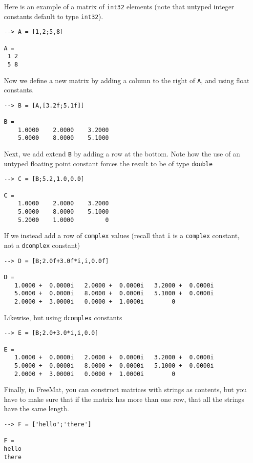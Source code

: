 Here is an example of a matrix of \verb|int32| elements (note that
untyped integer constants default to type \verb|int32|).
\begin{verbatim}
--> A = [1,2;5,8]

A = 
 1 2 
 5 8 
\end{verbatim}
Now we define a new matrix by adding a column to the right of
\verb|A|, and using float constants.
\begin{verbatim}
--> B = [A,[3.2f;5.1f]]

B = 
    1.0000    2.0000    3.2000 
    5.0000    8.0000    5.1000 
\end{verbatim}
Next, we add extend \verb|B| by adding a row at the bottom.  Note
how the use of an untyped floating point constant forces the
result to be of type \verb|double|
\begin{verbatim}
--> C = [B;5.2,1.0,0.0]

C = 
    1.0000    2.0000    3.2000 
    5.0000    8.0000    5.1000 
    5.2000    1.0000         0 
\end{verbatim}
If we instead add a row of \verb|complex| values (recall that \verb|i| is
a \verb|complex| constant, not a \verb|dcomplex| constant)
\begin{verbatim}
--> D = [B;2.0f+3.0f*i,i,0.0f]

D = 
   1.0000 +  0.0000i   2.0000 +  0.0000i   3.2000 +  0.0000i 
   5.0000 +  0.0000i   8.0000 +  0.0000i   5.1000 +  0.0000i 
   2.0000 +  3.0000i   0.0000 +  1.0000i        0           
\end{verbatim}
Likewise, but using \verb|dcomplex| constants
\begin{verbatim}
--> E = [B;2.0+3.0*i,i,0.0]

E = 
   1.0000 +  0.0000i   2.0000 +  0.0000i   3.2000 +  0.0000i 
   5.0000 +  0.0000i   8.0000 +  0.0000i   5.1000 +  0.0000i 
   2.0000 +  3.0000i   0.0000 +  1.0000i        0           
\end{verbatim}
Finally, in FreeMat, you can construct matrices with strings
as contents, but you have to make sure that if the matrix has
more than one row, that all the strings have the same length.
\begin{verbatim}
--> F = ['hello';'there']

F = 
hello
there
\end{verbatim}
